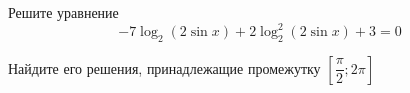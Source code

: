 \begin{ex}
	\begin{condition}
		\begin{enumcols}[label=\asbuk*)]
			\item Решите уравнение \[ -7\log_{2}(2\sin x)+2\log^2_2(2\sin x)+3=0 \]
			\item Найдите его решения, принадлежащие промежутку \( \left[ \dfrac{\pi}{2};2\pi \right] \)
		\end{enumcols}
	\end{condition}
\end{ex}